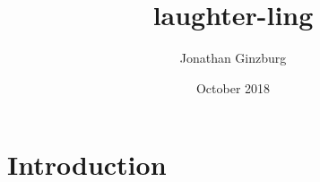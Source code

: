 \documentclass{article}
\title{laughter-ling}
\author{Jonathan Ginzburg}
\date{October 2018}
\begin{document}
\maketitle

\section{Introduction}
\end{document}
